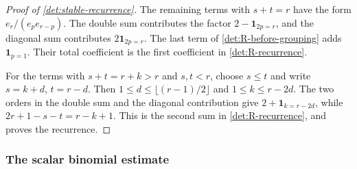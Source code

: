 \begin{proof}[Proof of \cref{det:stable-recurrence}]
The remaining terms with $s+t=r$ have the form
$e_r/(e_pe_{r-p})$.  The double sum contributes the factor
$2-\mathbf1_{2p=r}$, and the diagonal sum contributes
$2\mathbf1_{2p=r}$.  The last term of
\eqref{det:R-before-grouping} adds $\mathbf1_{p=1}$.
Their total coefficient is the first coefficient in
\eqref{det:R-recurrence}.

For the terms with $s+t=r+k>r$ and $s,t<r$, choose $s\leq t$ and
write $s=k+d$, $t=r-d$.  Then
$1\leq d\leq\lfloor(r-1)/2\rfloor$ and $1\leq k\leq r-2d$.
The two orders in the double sum and the diagonal contribution give
$2+\mathbf1_{k=r-2d}$, while
$2r+1-s-t=r-k+1$.  This is the second sum in
\eqref{det:R-recurrence}, and proves the recurrence.
\end{proof}

\subsubsection*{The scalar binomial estimate}

